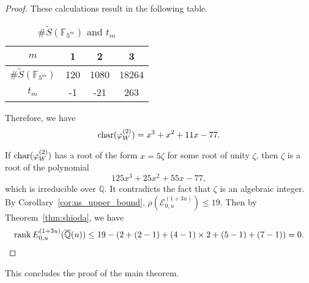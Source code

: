 \documentclass[main]{subfiles}
\begin{document}
\begin{proof}
    These calculations result in the following table.
    \begin{table}[ht]
        \centering
        \caption{$\# \tilde{S}(\mathbb{F}_{5^{m}})$ and $t_{m}$}
        \begin{tabular}{|c|c|c|c|}
            \hline
            $m$                                & 1   & 2    & 3     \\
            \hline
            $\# \tilde{S}(\mathbb{F}_{5^m})$ & 120 & 1080 & 18264 \\
            \hline
            $t_m$                            & -1  & -21  & 263   \\
            \hline
        \end{tabular}
    \end{table}

    Therefore, we have
    \begin{equation*}
        \operatorname{char}(\varphi_{W}^{(2)}) = x^{3} + x^{2} + 11 x - 77.
    \end{equation*}

    If $\operatorname{char} (\varphi_{W}^{(2)})$ has a root of the form $x=5 \zeta$ for some root of unity $\zeta$, then $\zeta$ is a root of the polynomial
    \begin{equation*}
        125x^{3} + 25x^{2} + 55 x - 77,
    \end{equation*}
    which is irreducible over $\mathbb{Q}$.
    It contradicts the fact that $\zeta$ is an algebraic integer.
    By Corollary~\ref{cor:ns_upper_bound}, $\rho(\mathcal{E}_{0,u}^{(1 + 3u)}) \leq 19$.
    Then by Theorem~\ref{thm:shioda}, we have
    \begin{equation*}
        \operatorname{rank} E_{0,u}^{(1 + 3u)}(\overline{\mathbb{Q}}(u)) \leq 19 - (2 + (2 - 1) + (4 - 1) \times 2 + (5 - 1) + (7 - 1)) = 0.
    \end{equation*}
\end{proof}

This concludes the proof of the main theorem.
\end{document}
